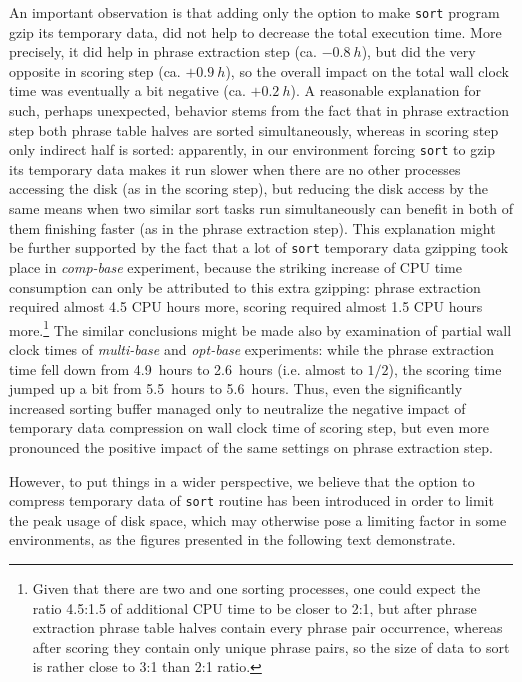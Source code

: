 An important observation is that adding only the option to make \texttt{sort} program gzip
its temporary data, did not help to decrease the total execution time.
More precisely, it did help in phrase extraction step (ca. $-0.8~h$), but did the very opposite
in scoring step (ca. $+0.9~h$), so the overall impact on the total wall clock time was eventually
a bit negative (ca. $+0.2~h$).
A reasonable explanation for such, perhaps unexpected, behavior stems from the fact that in phrase
extraction step both phrase table halves are sorted simultaneously, whereas in scoring step
only indirect half is sorted:
apparently, in our environment forcing \texttt{sort} to gzip its temporary data makes it run
slower when there are no other processes accessing the disk (as in the scoring step), but reducing
the disk access by the same means when two similar sort tasks run simultaneously can benefit
in both of them finishing faster (as in the phrase extraction step).
This explanation might be further supported by the fact that a lot of \texttt{sort} temporary
data gzipping took place in \emph{comp-base} experiment, because the striking increase of CPU time
consumption can only be attributed to this extra gzipping: %
phrase extraction required almost 4.5 CPU hours more, scoring required almost 1.5 CPU hours
more.\footnote{Given that there are two and one sorting processes, one could expect the ratio
4.5:1.5 of additional CPU time to be closer to 2:1, but after phrase extraction phrase table halves
contain every phrase pair occurrence, whereas after scoring they contain only unique phrase pairs,
so the size of data to sort is rather close to 3:1 than 2:1 ratio.}
The similar conclusions might be made also by examination of partial wall clock times of \emph{multi-base}
and \emph{opt-base} experiments: while the phrase extraction time fell down from 4.9~hours to 2.6~hours
(i.e. almost to $1/2$), the scoring time jumped up a bit from 5.5~hours to 5.6~hours.
Thus, even the significantly increased sorting buffer managed only to neutralize the negative impact of
temporary data compression on wall clock time of scoring step, but even more pronounced the positive
impact of the same settings on phrase extraction step.

However, to put things in a wider perspective, we believe that the option to compress temporary data of
\texttt{sort} routine has been introduced in order to limit the peak usage of disk space, which may
otherwise pose a limiting factor in some environments, as the figures presented in the following text
demonstrate.

